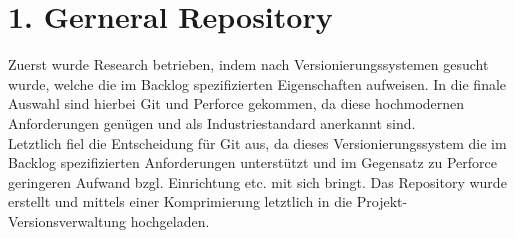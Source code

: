 \documentclass[a4paper, 11pt]{article} %
\begin{document}

\section*{1. Gerneral Repository}
Zuerst wurde Research betrieben, indem nach Versionierungssystemen gesucht wurde, welche die im Backlog spezifizierten 
Eigenschaften aufweisen. In die finale Auswahl sind hierbei Git und Perforce gekommen, da diese hochmodernen 
Anforderungen genügen und als Industriestandard anerkannt sind.
\\ Letztlich fiel die Entscheidung für Git aus, da dieses Versionierungssystem die im Backlog spezifizierten 
Anforderungen unterstützt und im Gegensatz zu Perforce geringeren Aufwand bzgl. Einrichtung etc. mit sich bringt.
Das Repository wurde erstellt und mittels einer Komprimierung letztlich in die Projekt-Versionsverwaltung 
hochgeladen.

\end{document}

